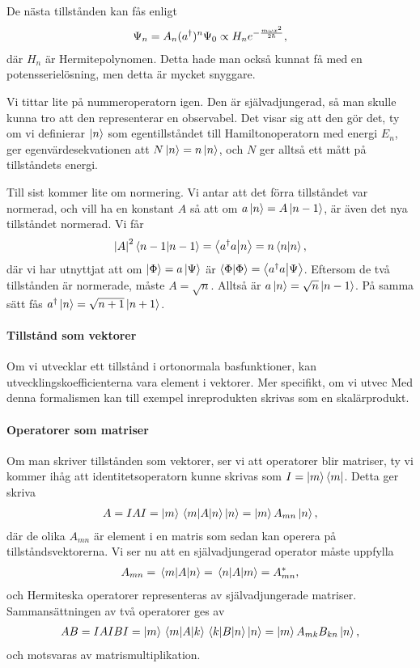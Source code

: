De nästa tillstånden kan fås enligt
\begin{align*}
	\Psi_{n} = A_{n}(a^{\dagger})^{n}\Psi_{0} \propto H_{n}e^{-\frac{m\omega x^{2}}{2\hbar}},
\end{align*}
där $H_{n}$ är Hermitepolynomen. Detta hade man också kunnat få med en potensserielösning, men detta är mycket snyggare.

Vi tittar lite på nummeroperatorn igen. Den är självadjungerad, så man skulle kunna tro att den representerar en observabel. Det visar sig att den gör det, ty om vi definierar $\ket{n}$ som egentillståndet till Hamiltonoperatorn med energi $E_{n}$, ger egenvärdesekvationen att $N\ket{n} = n\ket{n}$, och $N$ ger alltså ett mått på tillståndets energi.

Till sist kommer lite om normering. Vi antar att det förra tillståndet var normerad, och vill ha en konstant $A$ så att om $a\ket{n} = A\ket{n - 1}$, är även det nya tillståndet normerad. Vi får
\begin{align*}
	\abs{A}^{2}\braket{n - 1} = \braket{a^{\dagger}a}{n} = n\braket{n},
\end{align*}
där vi har utnyttjat att om $\ket{\Phi} = a\ket{\Psi}$ är $\braket{\Phi} = \braket{a^{\dagger}a}{\Psi}$. Eftersom de två tillstånden är normerade, måste $A = \sqrt{n}$. Alltså är $a\ket{n} = \sqrt{n}\ket{n - 1}$. På samma sätt fås $a^{\dagger}\ket{n} = \sqrt{n + 1}\ket{n + 1}$.

\paragraph{Tillstånd som vektorer}
Om vi utvecklar ett tillstånd i ortonormala basfunktioner, kan utvecklingskoefficienterna vara element i vektorer. Mer specifikt, om vi utvec Med denna formalismen kan till exempel inreprodukten skrivas som en skalärprodukt.

\paragraph{Operatorer som matriser}
Om man skriver tillstånden som vektorer, ser vi att operatorer blir matriser, ty vi kommer ihåg att identitetsoperatorn kunne skrivas som $I = \ket{m}\bra{m}$. Detta ger skriva
\begin{align*}
	A = IAI = \ket{m}\mel{m}{A}{n}\ket{n} = \ket{m}A_{mn}\ket{n},
\end{align*}
där de olika $A_{mn}$ är element i en matris som sedan kan operera på tillståndsvektorerna. Vi ser nu att en självadjungerad operator måste uppfylla
\begin{align*}
	A_{mn} = \mel{m}{A}{n} = \mel{n}{A}{m} = A_{mn}^{*},
\end{align*}
och Hermiteska operatorer representeras av självadjungerade matriser. Sammansättningen av två operatorer ges av
\begin{align*}
	AB = IAIBI = \ket{m}\mel{m}{A}{k}\mel{k}{B}{n}\ket{n} = \ket{m}A_{mk}B_{kn}\ket{n},
\end{align*}
och motsvaras av matrismultiplikation.

